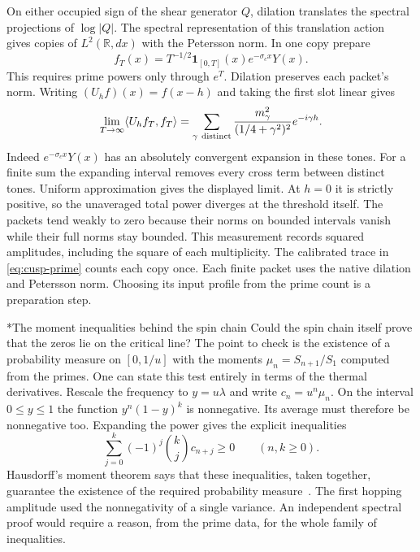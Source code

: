 \documentclass[11pt,letterpaper]{article}
\makeatletter
\renewcommand\subsection{\@startsection{subsection}{2}{\z@}{-2.0ex plus -.3ex}{.75ex}{\normalfont\normalsize\itshape}}
\numberwithin{equation}{section}
\makeatother
\begin{document}
On either occupied sign of the shear generator $Q$, dilation translates the spectral projections of $\log|Q|$. The spectral representation of this translation action~\cite{affine} gives copies of $L^2(\mathbb R,dx)$ with the Petersson norm. In one copy prepare
\[
 f_T(x)=T^{-1/2}\mathbf1_{[0,T]}(x)e^{-\sigma_c x}Y(x).
\]
This requires prime powers only through $e^T$. Dilation preserves each packet's norm. Writing $(U_h f)(x)=f(x-h)$ and taking the first slot linear gives
\[
 \lim_{T\to\infty}\langle U_h f_T,f_T\rangle
 =\sum_{\gamma\ {\rm distinct}}\frac{m_\gamma^2}{(1/4+\gamma^2)^2}e^{-i\gamma h}.
\]
Indeed $e^{-\sigma_c x}Y(x)$ has an absolutely convergent expansion in these tones. For a finite sum the expanding interval removes every cross term between distinct tones. Uniform approximation gives the displayed limit. At $h=0$ it is strictly positive, so the unaveraged total power diverges at the threshold itself. The packets tend weakly to zero because their norms on bounded intervals vanish while their full norms stay bounded. This measurement records squared amplitudes, including the square of each multiplicity. The calibrated trace in \eqref{eq:cusp-prime} counts each copy once. Each finite packet uses the native dilation and Petersson norm. Choosing its input profile from the prime count is a preparation step.

\subsection*{The moment inequalities behind the spin chain}
Could the spin chain itself prove that the zeros lie on the critical line? The point to check is the existence of a probability measure on $[0,1/u]$ with the moments $\mu_n=S_{n+1}/S_1$ computed from the primes. One can state this test entirely in terms of the thermal derivatives. Rescale the frequency to $y=u\lambda$ and write $c_n=u^n\mu_n$. On the interval $0\le y\le1$ the function $y^n(1-y)^k$ is nonnegative. Its average must therefore be nonnegative too. Expanding the power gives the explicit inequalities
\[
 \sum_{j=0}^{k}(-1)^j\binom{k}{j}c_{n+j}\ge0
 \qquad (n,k\ge0).
\]
Hausdorff's moment theorem says that these inequalities, taken together, guarantee the existence of the required probability measure~\cite{hausdorffmoments}. The first hopping amplitude used the nonnegativity of a single variance. An independent spectral proof would require a reason, from the prime data, for the whole family of inequalities.
\end{document}
